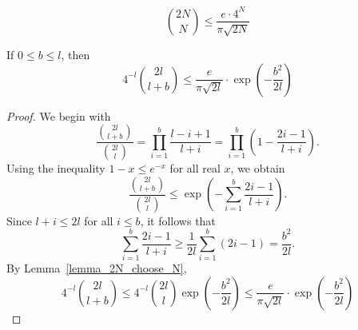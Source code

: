 \documentclass[10pt,a4paper]{amsart}
\begin{document}
\begin{lemma}\label{lemma_2N_choose_N}
\[{2N\choose N}\le \frac{e\cdot4^N}{\pi \sqrt{2N}}\]
\end{lemma}

\begin{lemma}\label{lemma_exp}
If $0\le b\le l$, then
    \[4^{-l}{2l \choose l+b}\le \frac{e}{\pi  \sqrt{2l}}\cdot \exp\!\left(-\frac{b^2}{2l}\right)\]
\end{lemma}

\begin{proof}
We begin with
\[
\frac{{2l \choose l+b}}{{2l \choose l}}
= \prod_{i=1}^b \frac{l - i + 1}{l + i}
= \prod_{i=1}^b \left(1 - \frac{2i - 1}{l + i}\right).
\]
Using the inequality $1 - x \le e^{-x}$ for all real $x$, we obtain
\[
\frac{{2l \choose l+b}}{{2l \choose l}}
\le \exp\!\left(-\sum_{i=1}^b \frac{2i - 1}{l + i}\right).
\]
Since $l + i \le 2l$ for all $i \le b$, it follows that
\[
\sum_{i=1}^b \frac{2i - 1}{l + i}
\ge \frac{1}{2l}\sum_{i=1}^b (2i - 1)
= \frac{b^2}{2l}.
\]
By Lemma~\ref{lemma_2N_choose_N}, 
\[4^{-l}{2l \choose l+b}\le 4^{-l}{2l \choose l} \exp\!\left(-\frac{b^2}{2l}\right)
\le \frac{e}{\pi  \sqrt{2l}}\cdot \exp\!\left(-\frac{b^2}{2l}\right)\]
\end{proof}
\end{document}
